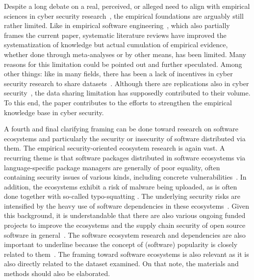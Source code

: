 Despite a long debate on a real, perceived, or alleged need to align with
empirical sciences in cyber security research~\cite{Herley17}, the empirical
foundations are arguably still rather limited. Like in empirical software
engineering~\cite{Shepperd13}, which also partially frames the current paper,
systematic literature reviews have improved the systematization of knowledge but
actual cumulation of empirical evidence, whether done through meta-analyses or
by other means, has been limited. Many reasons for this limitation could be
pointed out and further speculated. Among other things: like in many fields,
there has been a lack of incentives in cyber security research to share
datasets~\cite{Zheng18}. Although there are replications also in cyber
security~\cite{Ruohonen15COSE}, the data sharing limitation has supposedly
contributed to their volume. To this end, the paper contributes to the efforts
to strengthen the empirical knowledge base in cyber security.

A fourth and final clarifying framing can be done toward research on software
ecosystems and particularly the security or insecurity of software distributed
via them. The empirical security-oriented ecosystem research is again vast. A
recurring theme is that software packages distributed in software ecosystems via
language-specific package managers are generally of poor equality, often
containing security issues of various kinds, including concrete
vulnerabilities~\cite{Ruohonen21PST}. In addition, the ecosystems exhibit a risk
of malware being uploaded, as is often done together with so-called
typo-squatting \cite{Ruohonen18IWESEP, Vaidya19}. The underlying security risks
are intensified by the heavy use of software dependencies in these
ecosystems~\cite{Zerouali22}. Given this background, it is understandable that
there are also various ongoing funded projects to improve the ecosystems and the
supply chain security of open source software in
general~\cite{Ruohonen24JSS}. The software ecosystem research and dependencies
are also important to underline because the concept of (software) popularity is
closely related to them~\cite{Kula18, Qiu18}. The framing toward software
ecosystems is also relevant as it is also directly related to the dataset
examined. On that note, the materials and methods should also be elaborated.
